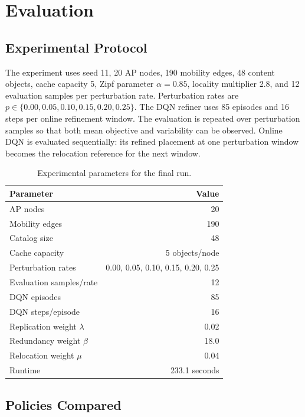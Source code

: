 \section{Evaluation}

\subsection{Experimental Protocol}

The experiment uses seed 11, 20 AP nodes, 190 mobility edges, 48 content objects, cache capacity 5, Zipf parameter \(\alpha=0.85\), locality multiplier 2.8, and 12 evaluation samples per perturbation rate. Perturbation rates are \(p\in\{0.00,0.05,0.10,0.15,0.20,0.25\}\). The DQN refiner uses 85 episodes and 16 steps per online refinement window. The evaluation is repeated over perturbation samples so that both mean objective and variability can be observed. Online DQN is evaluated sequentially: its refined placement at one perturbation window becomes the relocation reference for the next window.

\begin{table}[t]
\centering
\caption{Experimental parameters for the final run.}
\label{tab:parameters}
\begin{tabular}{lr}
\toprule
Parameter & Value \\
\midrule
AP nodes & 20 \\
Mobility edges & 190 \\
Catalog size & 48 \\
Cache capacity & 5 objects/node \\
Perturbation rates & 0.00, 0.05, 0.10, 0.15, 0.20, 0.25 \\
Evaluation samples/rate & 12 \\
DQN episodes & 85 \\
DQN steps/episode & 16 \\
Replication weight \(\lambda\) & 0.02 \\
Redundancy weight \(\beta\) & 18.0 \\
Relocation weight \(\mu\) & 0.04 \\
Runtime & 233.1 seconds \\
\bottomrule
\end{tabular}
\end{table}

\subsection{Policies Compared}

